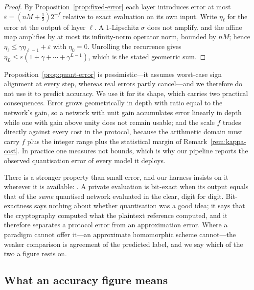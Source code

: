 \begin{proof}
By Proposition~\ref{prop:fixed-error} each layer introduces error at most
$\varepsilon = (nM + \tfrac12)2^{-f}$ relative to exact evaluation on its own
input. Write $\eta_\ell$ for the error at the output of layer $\ell$. A
$1$-Lipschitz $\sigma$ does not amplify, and the affine map amplifies by at most
its infinity-norm operator norm, bounded by $nM$; hence $\eta_\ell \le \gamma
\eta_{\ell-1} + \varepsilon$ with $\eta_0 = 0$. Unrolling the recurrence gives
$\eta_L \le \varepsilon(1 + \gamma + \cdots + \gamma^{L-1})$, which is the stated
geometric sum.
\end{proof}

Proposition~\ref{prop:quant-error} is pessimistic---it assumes worst-case sign
alignment at every step, whereas real errors partly cancel---and we therefore do
not use it to predict accuracy. We use it for its shape, which carries two
practical consequences. Error grows geometrically in depth with ratio equal to the
network's gain, so a network with unit gain accumulates error linearly in depth
while one with gain above unity does not remain usable; and the scale $f$ trades
directly against every cost in the protocol, because the arithmetic domain must
carry $f$ plus the integer range plus the statistical margin of
Remark~\ref{rem:kappa-cost}. In practice one measures not bounds, which is
why our pipeline reports the observed quantisation error of every model it
deploys.

\begin{remark}
\label{rem:exactness}
There is a stronger property than small error, and our harness insists on it
wherever it is available: . A private evaluation is bit-exact
when its output equals that of the \emph{same} quantised network evaluated in the
clear, digit for digit. Bit-exactness says nothing about whether quantisation was
a good idea; it says that the cryptography computed what the plaintext reference
computed, and it therefore separates a protocol error from an approximation error.
Where a paradigm cannot offer it---an approximate homomorphic scheme cannot---the
weaker comparison is agreement of the predicted label, and we say which of the two
a figure rests on.
\end{remark}

\subsection{What an accuracy figure means}
\label{sec:ml:metrics}

